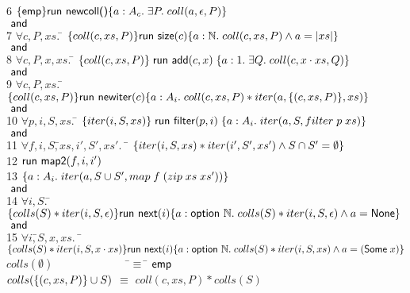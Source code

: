 \documentclass[preprint,natbib]{sigplanconf}
\begin{document}
{\begin{tabbing}
6 \>
\> $\{{\mathsf{emp}}\}{\mbox{\textsf{{run }}}{\mbox{\textsf{{newcoll()}}}}}\{{a:A_c}.\;{\exists P.\; coll(a, \epsilon,P)}\}$ \\
\>
\> $\mbox{\textsf{{ and }}}$ \\
7 \>
\> $\forall c, P, xs.\;$\=
         $\{{coll(c, xs, P)}\}
          \mbox{\textsf{{run }}}{\mbox{\textsf{{size}}}(c)}
           \{{a:\mathbb{N}.\; coll(c, xs, P) \land a = |xs|}\}$ \\
\> 
\> $\mbox{\textsf{{ and }}}$ \\
8 \> \> $\forall c, P, x, xs.\;$\=
               $\{{coll(c, xs, P)}\}
                \;\mbox{\textsf{{run }}}{\mbox{\textsf{{add}}}(c, x)}\;
                \{{a:1.\; \exists Q.\; coll(c, x\cdot xs, Q)}\}$ \\
\>
\> $\mbox{\textsf{{ and }}}$ \\
9 \>
\> $\forall c, P, xs.\;$\=
    $\{{coll(c, xs, P)}\}
     \mbox{\textsf{{run }}}{\mbox{\textsf{{newiter}}}(c)}
     \{{a:A_i.\; coll(c, xs, P) * iter(a, \{{(c, xs, P)}\}, xs)}\}$ \\
\>
\> $\mbox{\textsf{{ and }}}$ \\
10 \>
\> $\forall p, i, S, xs.\;$\=
         $\{{iter(i, S, xs)}\}
          \;\mbox{\textsf{{run }}}{\mbox{\textsf{{filter}}}(p, i)}\;
          \{{a:A_i.\; iter(a, S, filter\; p\;xs)}\}$ \\
 \> 
\> $\mbox{\textsf{{ and }}}$ \\
11 \> 
\> $\forall f, i, S,$\=$ xs, i', S', xs'.\;$ \= 
     $\{{iter(i, S, xs) * iter(i', S', xs') \land S \cap S' = \emptyset}\}$ \\
12 \> \> \> \> $\mbox{\textsf{{run }}}{\mbox{\textsf{{map2}}}(f, i, i')}$ \\
13 \> \> \> \>$\{{a:A_i.\; iter(a, S \cup S', map\;f\;(zip\;xs\;xs'))}\}$ \\
\>
\> $\mbox{\textsf{{ and }}}$ \\
14 \>
\> $\forall i, S.\;$\=
    $\{{colls(S) * iter(i, S, \epsilon)}\}  
      \mbox{\textsf{{run }}}{\mbox{\textsf{{next}}}(i)}
      \{{a:\mbox{\textsf{{option }}}{\mathbb{N}}.\; colls(S) * iter(i, S, \epsilon) \land a = \mbox{\textsf{{None}}}}\}$ \\
\>
\> $\mbox{\textsf{{ and }}}$ \\
15 \> \> $\forall i,$\=$ S, x, xs.\;$ \= 
  $\{{colls(S) * iter(i, S, x \cdot xs)}\}
   \mbox{\textsf{{run }}}{\mbox{\textsf{{next}}}(i)}
   \{{a:\mbox{\textsf{{option }}}{\mathbb{N}}.\; 
              colls(S) * iter(i, S, xs) \land a = (\mbox{\textsf{{Some}}}\;x)}\}$ 
\\[0.5em]
$colls(\emptyset) \qquad\qquad\qquad\;\;$ \=$\equiv\;$\= $\mathsf{emp}$ \\
$colls(\{{(c,xs,P)}\} \cup S)$ \> $\equiv$ \> $coll(c, xs, P) * colls(S)$ \\
\end{tabbing}
}
\end{document}
